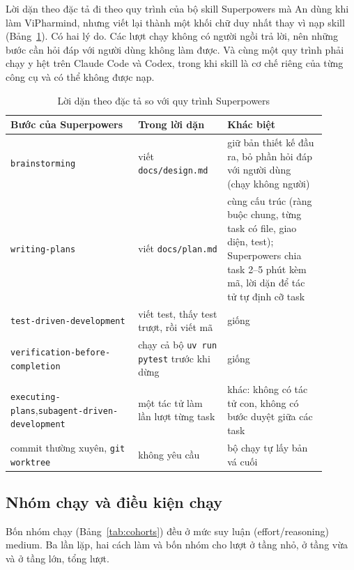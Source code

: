 Lời dặn theo đặc tả đi theo quy trình của bộ skill Superpowers mà An dùng khi làm ViPharmind, nhưng viết
lại thành một khối chữ duy nhất thay vì nạp skill (Bảng~\ref{tab:superpowers}). Có hai lý do. Các lượt
chạy không có người ngồi trả lời, nên những bước cần hỏi đáp với người dùng không làm được. Và cùng một
quy trình phải chạy y hệt trên Claude Code và Codex, trong khi skill là cơ chế riêng của từng công cụ và
có thể không được nạp.

\begin{table}[H]
\centering\footnotesize
\caption{Lời dặn theo đặc tả so với quy trình Superpowers}
\label{tab:superpowers}
\begin{tabular}{>{\raggedright\arraybackslash}p{0.36\linewidth}>{\raggedright\arraybackslash}p{0.25\linewidth}>{\raggedright\arraybackslash}p{0.29\linewidth}}
\toprule
Bước của Superpowers & Trong lời dặn & Khác biệt \\
\midrule
\texttt{brainstorming} & viết \texttt{docs/design.md} & giữ bản thiết kế đầu ra, bỏ phần hỏi đáp với người
dùng (chạy không người) \\
\texttt{writing-plans} & viết \texttt{docs/plan.md} & cùng cấu trúc (ràng buộc chung, từng task có file,
giao diện, test); Superpowers chia task 2--5 phút kèm mã, lời dặn để tác tử tự định cỡ task \\
\texttt{test-driven-development} & viết test, thấy test trượt, rồi viết mã & giống \\
\texttt{verification-before-completion} & chạy cả bộ \texttt{uv run pytest} trước khi dừng & giống \\
\texttt{executing-plans},\newline \texttt{subagent-driven-development} & một tác tử làm lần lượt từng task & khác:
không có tác tử con, không có bước duyệt giữa các task \\
commit thường xuyên, \texttt{git worktree} & không yêu cầu & bộ chạy tự lấy bản vá cuối \\
\bottomrule
\end{tabular}
\end{table}

\subsection{Nhóm chạy và điều kiện chạy}\label{sec:conditions}

Bốn nhóm chạy (Bảng~\ref{tab:cohorts}) đều ở mức suy luận (effort/reasoning) medium. Ba lần lặp, hai cách làm và
bốn nhóm cho \NumRunsSmallTotal{} lượt ở tầng nhỏ, \NumRunsMediumTotal{} ở tầng vừa và \NumRunsLargeTotal{}
ở tầng lớn, tổng \NumRunsTotal{} lượt.

